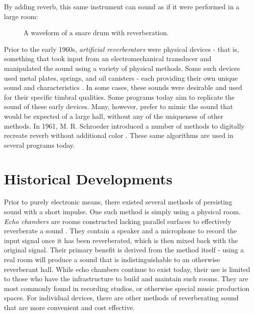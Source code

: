 By adding reverb, this same instrument can sound as if it were performed in a large room:

\begin{figure}[h] %
	\begin{center}
		\caption{A waveform of a snare drum with reverberation.}
	\end{center}
\end{figure} %

Prior to the early 1960s, \textit{artificial reverberators} were physical devices - that is, something that took input from an electromechanical transducer and manipulated the sound using a variety of physical methods. Some such devices used metal plates, springs, and oil canisters - each providing their own unique sound and characteristics \cite{FiftyYears}. In some cases, these sounds were desirable and used for their specific timbral qualities. Some programs today aim to replicate the sound of these early devices. Many, however, prefer to mimic the sound that would be expected of a large hall, without any of the uniqueness of other methods. In 1961, M. R. Schroeder introduced a number of methods to digitally recreate reverb without additional color \cite{schroeder1961natural}. These same algorithms are used in several programs today.

\section{Historical Developments}
Prior to purely electronic means, there existed several methods of persisting sound with a short impulse. One such method is simply using a physical room. \textit{Echo chambers} are rooms constructed lacking parallel surfaces to effectively reverberate a sound \cite{FiftyYears}. They contain a speaker and a microphone to record the input signal once it has been reverberated, which is then mixed back with the original signal. Their primary benefit is derived from the method itself - using a real room will produce a sound that is indistinguishable to an otherwise reverberant hall. While echo chambers continue to exist today, their use is limited to those who have the infrastructure to build and maintain such rooms. They are most commonly found in recording studios, or otherwise special music production spaces. For individual devices, there are other methods of reverberating sound that are more convenient and cost effective.

